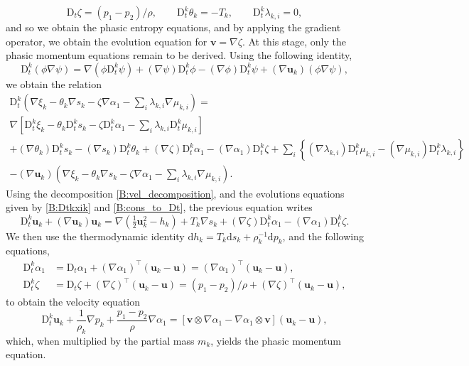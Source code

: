 \documentclass{myclass}
\newcommand{\Dt}{\mathrm{D}_t}
\newcommand{\vel}{\bm{u}}
\newcommand{\pth}[1]  {\left( #1 \right)}
\newcommand{\brck}[1]  {\left[ #1 \right]}
\newcommand{\acco}[1]{\left\{ #1 \right\}}
\begin{document}
\begin{equation}\label{B:cons_to_Dt}
\Dt\zeta = (p_1-p_2)/\rho, \qquad \Dt^k\theta_k = -T_k, \qquad \Dt^k\lambda_{k,i}=0,
\end{equation}
and so we obtain the phasic entropy equations, and by applying the gradient operator, we obtain the evolution equation for $\bm{v}=\nabla\zeta$. At this stage, only the phasic momentum equations remain to be derived.  Using the following identity,
\begin{equation}
\Dt^k\pth{\phi\nabla\psi} = \nabla\pth{\phi\Dt^k\psi} + \pth{\nabla\psi}\Dt^k\phi - \pth{\nabla\phi}\Dt^k\psi + \pth{\nabla\vel_k}\pth{\phi\nabla\psi},
\end{equation}
we obtain the relation
\begin{multline}
\Dt^k\pth{\nabla\xi_k - \theta_k\nabla s_k - \zeta\nabla\alpha_1 - \sum_i\lambda_{k,i}\nabla\mu_{k,i}}  = \\ \nabla\brck{\Dt^k\xi_k - \theta_k\Dt^k s_k - \zeta\Dt^k\alpha_1 - \sum_i\lambda_{k,i}\Dt^k\mu_{k,i}} \\
+\pth{\nabla\theta_k}\Dt^k s_k - \pth{\nabla s_k}\Dt^k\theta_k + \pth{\nabla\zeta}\Dt^k\alpha_1 - \pth{\nabla\alpha_1}\Dt^k\zeta + \sum_i\acco{\pth{\nabla\lambda_{k,i}}\Dt^k\mu_{k,i} - \pth{\nabla\mu_{k,i}}\Dt^k\lambda_{k,i}} \\
-\pth{\nabla\vel_k}\pth{\nabla\xi_k - \theta_k\nabla s_k - \zeta\nabla\alpha_1 - \sum_i\lambda_{k,i}\nabla\mu_{k,i}}.
\end{multline}
Using the decomposition \eqref{B:vel_decomposition}, and the evolutions equations given by \eqref{B:Dtkxik} and \eqref{B:cons_to_Dt}, the previous equation writes
\begin{equation}
\Dt^k\vel_k + \pth{\nabla\vel_k}\vel_k = \nabla\pth{\tfrac{1}{2}\vel_k^2 - h_k} + T_k\nabla s_k + \pth{\nabla\zeta}\Dt^k\alpha_1 - \pth{\nabla\alpha_1}\Dt^k\zeta.
\end{equation}
We then use the thermodynamic identity $\mathrm{d}h_k = T_k\mathrm{d}s_k + \rho_k^{-1}\mathrm{d}p_k$, and the following equations,
\begin{align}
\Dt^k\alpha_1 &= \Dt\alpha_1 + \pth{\nabla\alpha_1}^\top (\vel_k-\vel) = \pth{\nabla\alpha_1}^\top (\vel_k-\vel),\\
\Dt^k\zeta &= \Dt\zeta + \pth{\nabla\zeta}^\top (\vel_k-\vel) = (p_1-p_2)/\rho + \pth{\nabla\zeta}^\top (\vel_k-\vel),
\end{align}
to obtain the velocity equation
\begin{equation}
\Dt^k\vel_k + \frac{1}{\rho_k}\nabla p_k + \frac{p_1-p_2}{\rho}\nabla\alpha_1 = \brck{\bm{v}\otimes\nabla\alpha_1 - \nabla\alpha_1\otimes\bm{v}}\pth{\vel_k-\vel},
\end{equation}
which, when multiplied by the partial mass $m_k$, yields the phasic momentum equation.
\end{document}

